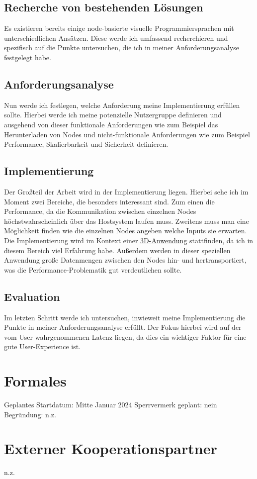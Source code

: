 \documentclass[ngerman]{article}
\begin{document}
\subsection{Recherche von bestehenden Lösungen}
Es existieren bereits einige node-basierte visuelle Programmiersprachen mit unterschiedlichen Ansätzen. Diese werde ich umfassend recherchieren und spezifisch auf die Punkte untersuchen, die ich in meiner Anforderungsanalyse festgelegt habe.

\subsection{Anforderungsanalyse}
Nun werde ich festlegen, welche Anforderung meine Implementierung erfüllen sollte. Hierbei werde ich meine potenzielle Nutzergruppe definieren und ausgehend von dieser funktionale Anforderungen wie zum Beispiel das Herunterladen von Nodes und nicht-funktionale Anforderungen wie zum Beispiel Performance, Skalierbarkeit und Sicherheit definieren.

\subsection{Implementierung}
Der Großteil der Arbeit wird in der Implementierung liegen. Hierbei sehe ich im Moment zwei Bereiche, die besonders interessant sind. Zum einen die Performance, da die Kommunikation zwischen einzelnen Nodes höchstwahrscheinlich über das Hostsystem laufen muss. Zweitens muss man eine Möglichkeit finden wie die einzelnen Nodes angeben welche Inputs sie erwarten. 
\linebreak
\linebreak
Die Implementierung wird im Kontext einer \href{https://plant.max-richter.dev}{3D-Anwendung} stattfinden, da ich in diesem Bereich viel Erfahrung habe. Außerdem werden in dieser speziellen Anwendung große Datenmengen zwischen den Nodes hin- und hertransportiert, was die Performance-Problematik gut verdeutlichen sollte.

\subsection{Evaluation}
Im letzten Schritt werde ich untersuchen, inwieweit meine Implementierung die Punkte in meiner Anforderungsanalyse erfüllt. Der Fokus hierbei wird auf der vom User wahrgenommenen Latenz liegen, da dies ein wichtiger Faktor für eine gute User-Experience ist. \cite{6876022}

\section{Formales}
Geplantes Startdatum: Mitte Januar 2024
\linebreak
Sperrvermerk geplant: nein
\linebreak
Begründung: n.z.

\section{Externer Kooperationspartner}
n.z.

\pagebreak

\printbibliography
\end{document}
